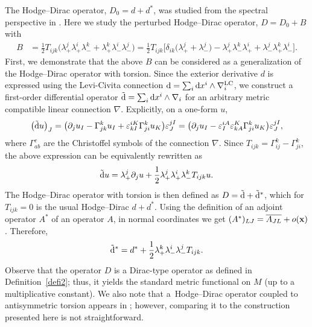 \documentclass[pdftex]{sigma}
\numberwithin{equation}{section}
\theoremstyle{definition}
\begin{document}
The Hodge--Dirac operator, $D_0=d+d^\ast$, was studied from the spectral perspective in \cite{dabrowski2024a}. Here we study
the perturbed Hodge--Dirac operator, $D=D_0+B$ with
\begin{align}
 B&=\frac{1}{2} T_{ijk}\bigl(\lambda_+^j\lambda_+^i\lambda_-^k+\lambda_+^k\lambda_-^i\lambda_-^j\bigr) =\frac{1}{2}T_{ijk}\bigl[\delta_{ik}\bigl(\lambda^j_++\lambda^j_-\bigr)-\lambda^j_+\lambda^k_-\lambda^i_+ + \lambda^j_-\lambda^k_+ \lambda^i_-\bigr].\label{eq:HDB}
\end{align}
First, we demonstrate that the above $B$ can be considered as a generalization of the Hodge--Dirac operator with torsion. Since the exterior derivative $d$ is expressed using the Levi-Civita
connection ${\rm d} = \sum_i {\rm d}x^i \wedge \nabla^{\mathrm{LC}}_i$, we construct
a first-order differential operator $\tilde{\rm d} = \sum_i {\rm d}x^i \wedge \nabla_i$ for an arbitrary metric compatible linear connection $\nabla$. Explicitly, on a one-form $u$,
\[
 \bigl(\tilde{\rm d} u\bigr)_J=\bigl(\partial_j u_I-\Gamma^k_{jk} u_I + \varepsilon^{iK}_{kI} \Gamma^k_{ji}u_K\bigr)\varepsilon^{jI}_J=\bigl(\partial_j u_I-\varepsilon^{iA}_I\varepsilon^{K}_{kA} \Gamma^k_{ji}u_K\bigr)\varepsilon^{jI}_J,
\]
where $\Gamma^{c}_{ab}$ are the Christoffel symbols of the connection $\nabla$. Since $T_{ijk}=\Gamma^{k}_{ij}-\Gamma^{k}_{ji}$, the above expression can be equivalently rewritten as
\[
 \tilde{\rm d} u=\lambda_+^j \partial_j u + \frac{1}{2}\lambda_+^j \lambda_+^i\lambda_-^k T_{ijk}u.
\]
The Hodge--Dirac operator with torsion is then defined as $D=\tilde{\rm d}+\tilde{\rm d}^\ast$, which for $T_{ijk}=0$ is the usual
Hodge--Dirac $d+d^*$. Using the definition of an adjoint operator $A^\ast$ of an operator $A$, in normal coordinates we get
$
 (A^\ast)_{LJ}=\overline{A_{JL}} + o({\bf x})$.
Therefore,
\[
 \tilde{\rm d}^\ast=d^\ast+\frac{1}{2}\lambda_+^k \lambda_-^i \lambda_-^j T_{ijk}.
\]
Observe that the operator $D$ is a Dirac-type operator as defined in Definition~\ref{defi2}; thus, it yields the standard metric functional on $M$ (up to a multiplicative constant). We also note that a~Hodge--Dirac operator coupled to antisymmetric torsion appears in \cite{wang2024}; however, comparing it to the construction presented here is not straightforward.
\end{document}
